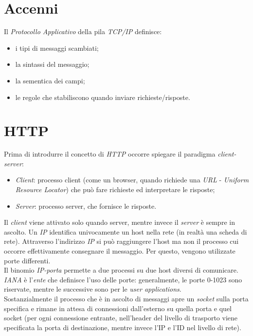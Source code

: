 \section{Accenni}
Il \textit{Protocollo Applicativo} della pila \textit{TCP/IP} definisce:
\begin{itemize}
    \item i tipi di messaggi scambiati;
    \item la sintassi del messaggio;
    \item la sementica dei campi;
    \item le regole che stabiliscono quando inviare richieste/risposte.
\end{itemize}

\section{HTTP}
Prima di introdurre il concetto di \textit{HTTP} occorre spiegare il paradigma \textit{client-server}:
\begin{itemize}
    \item \textit{Client}: processo client (come un browser, quando richiede una \textit{URL} - \textit{Uniform Resource Locator}) che può fare richieste ed interpretare le risposte;
    \item \textit{Server}: processo server, che fornisce le risposte.
\end{itemize}
Il \textit{client} viene attivato solo quando server, mentre invece il \textit{server} è sempre in ascolto.
Un \textit{IP} identifica univocamente un host nella rete (in realtà una scheda di rete).
Attraverso l'indirizzo \textit{IP} si può raggiungere l'host ma non il processo cui occorre effettivamente consegnare il messaggio. Per questo, vengono utilizzate porte differenti. \\
Il binomio \textit{IP-porta} permette a due processi su due host diversi di comunicare. \\
\textit{IANA} è l'\textit{ente} che definisce l'uso delle porte: generalmente, le porte 0-1023 sono riservate, mentre le successive sono per le \textit{user applications}. \\
Sostanzialmente il processo che è in ascolto di messaggi apre un \textit{socket} sulla porta specifica e rimane in attesa di connessioni dall'esterno su quella porta e quel socket (per ogni connessione entrante, nell'header del livello di trasporto viene specificata la porta di destinazione, mentre invece l'IP e l'ID nel livello di rete). \\
